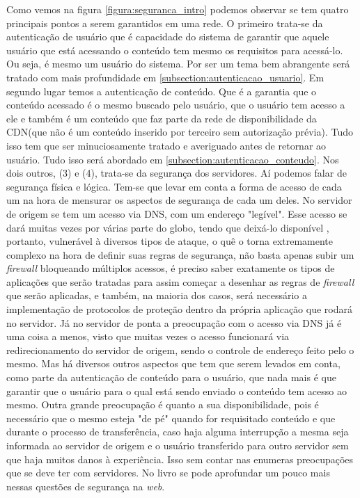 Como vemos na figura \ref{figura:seguranca_intro} podemos observar se tem quatro principais pontos a serem garantidos em uma rede. O primeiro trata-se da autentica\c{c}\~ao de usu\'ario que \'e capacidade do sistema de garantir que aquele usu\'ario que est\'a acessando o conte\'udo tem mesmo os requisitos para acess\'a-lo. Ou seja, \'e mesmo um usu\'ario do sistema. Por ser um tema bem abrangente ser\'a tratado com mais profundidade em \ref{subsection:autenticacao_usuario}.
\newline
Em segundo lugar temos a autentica\c{c}\~ao de conte\'udo. Que \'e a garantia que o conte\'udo acessado \'e o mesmo buscado pelo usu\'ario, que o usu\'ario tem acesso a ele e tamb\'em \'e um conte\'udo que faz parte da rede de disponibilidade da CDN(que n\~ao \'e um conte\'udo inserido por terceiro sem autoriza\c{c}\~ao pr\'evia). Tudo isso tem que ser minuciosamente tratado e averiguado antes de retornar ao usu\'ario. Tudo isso ser\'a abordado em \ref{subsection:autenticacao_conteudo}.
\newline
Nos dois outros, (3) e (4), trata-se da seguran\c{c}a dos servidores. A\'i podemos falar de seguran\c{c}a f\'isica e l\'ogica. Tem-se que levar em conta a forma de acesso de cada um na hora de mensurar os aspectos de seguran\c{c}a de cada um deles. 
\newline
No servidor de origem se tem um acesso via DNS, com um endereço "leg\'ivel". Esse acesso se dar\'a muitas vezes por v\'arias parte do globo, tendo que deix\'a-lo dispon\'ivel , portanto, vulner\'avel \`a diversos tipos de ataque, o qu\^e o torna extremamente complexo na hora de definir suas regras de seguran\c{c}a, n\~ao basta apenas subir um \textit{firewall} bloqueando m\'ultiplos acessos, \'e preciso saber exatamente os tipos de aplica\c{c}\~oes que ser\~ao tratadas para assim come\c{c}ar a desenhar as regras de \textit{firewall} que ser\~ao aplicadas, e tamb\'em, na maioria dos casos, ser\'a necess\'ario a implementa\c{c}\~ao de protocolos de prote\c{c}\~ao dentro da pr\'opria aplica\c{c}\~ao que rodar\'a no servidor.
\newline
J\'a no servidor de ponta a preocupa\c{c}\~ao com o acesso via DNS j\'a \'e uma coisa a menos, visto que muitas vezes o acesso funcionar\'a via redirecionamento do servidor de origem, sendo o controle de endere\c{c}o feito pelo o mesmo. Mas h\'a diversos outros aspectos que tem que serem levados em conta, como parte da autentica\c{c}\~ao de conte\'udo para o usu\'ario, que nada mais \'e que garantir que o usu\'ario para o qual est\'a sendo enviado o conte\'udo tem acesso ao mesmo. Outra grande preocupa\c{c}\~ao \'e quanto a sua disponibilidade, pois \'e necess\'ario que o mesmo esteja "de p\'e" quando for requisitado conte\'udo e que durante o processo de transfer\^encia, caso haja alguma interrup\c{c}\~ao a mesma seja informada ao servidor de origem e o usu\'ario transferido para outro servidor sem que haja muitos danos \`a experi\^encia. Isso sem contar nas enumeras preocupa\c{c}\~oes que se deve ter com servidores. No livro \cite{stallings1995network} se pode aprofundar um pouco mais nessas quest\~oes de seguran\c{c}a na \textit{web}.
